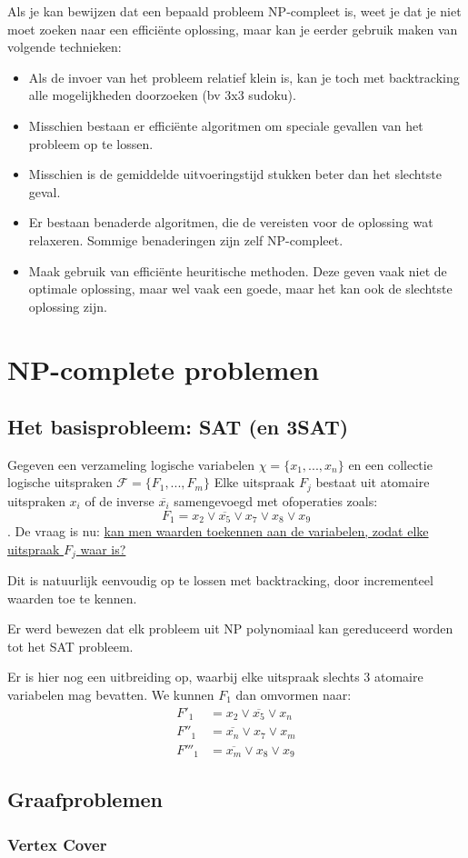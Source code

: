 \documentclass{report}
\begin{document}
Als je kan bewijzen dat een bepaald probleem NP-compleet is, weet je dat je niet moet zoeken naar een efficiënte oplossing, maar kan je eerder gebruik maken van volgende technieken:
\begin{itemize}
	\item Als de invoer van het probleem relatief klein is, kan je toch met backtracking alle mogelijkheden doorzoeken (bv 3x3 sudoku).
	\item Misschien bestaan er efficiënte algoritmen om speciale gevallen van het probleem op te lossen.
	\item Misschien is de gemiddelde uitvoeringstijd stukken beter dan het slechtste geval.
	\item Er bestaan benaderde algoritmen, die de vereisten voor de oplossing wat relaxeren. Sommige benaderingen zijn zelf NP-compleet.
	\item Maak gebruik van efficiënte heuritische methoden. Deze geven vaak niet de optimale oplossing, maar wel vaak een goede, maar het kan ook de slechtste oplossing zijn.
\end{itemize}

\section{NP-complete problemen}
\subsection{Het basisprobleem: SAT (en 3SAT)}
Gegeven een verzameling logische variabelen $\chi = \{x_1, ..., x_n\}$ en een collectie logische uitspraken $\mathcal{F} = \{F_1, ..., F_m \}$
Elke uitspraak $F_j$ bestaat uit atomaire uitspraken $x_i$ of de inverse $\overline{x_i}$ samengevoegd met ofoperaties zoals:
$$F_1 = x_2 \vee \overline{x_5} \vee x_7 \vee x_8 \vee x_9$$.
De vraag is nu: \underline{kan men waarden toekennen aan de variabelen, zodat elke uitspraak $F_j$ waar is?} 

Dit is natuurlijk eenvoudig op te lossen met backtracking, door incrementeel waarden toe te kennen.

Er werd bewezen dat elk probleem uit NP polynomiaal kan gereduceerd worden tot het SAT probleem. 

Er is hier nog een uitbreiding op, waarbij elke uitspraak slechts 3 atomaire variabelen mag bevatten. We kunnen $F_1$ dan omvormen naar:
\begin{equation*}
	\begin{split}
		F'_1  & = x_2 \vee \overline{x_5} \vee x_n \\
		F''_1  & = \overline{x_n} \vee x_7 \vee x_m \\
		F'''_1 & = \overline{x_m} \vee x_8 \vee x_9
	\end{split}
\end{equation*}

\subsection{Graafproblemen}
\subsubsection{Vertex Cover}
\end{document}
